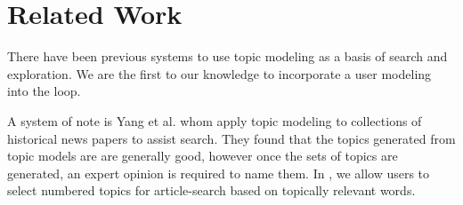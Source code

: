 \section{Related Work}

There have been previous systems to use topic modeling as a basis of
search and exploration. We are the first to our knowledge to incorporate
a user modeling into the loop. 

A system of note is Yang et al. \cite{yang2011topic} whom apply topic modeling to 
collections of historical news papers to assist search. They 
found that the topics generated from topic models are 
are generally good, however once the sets of topics are 
generated, an expert opinion is required to name them. 
In \system, we allow users to select numbered topics for article-search 
based on topically relevant words.


